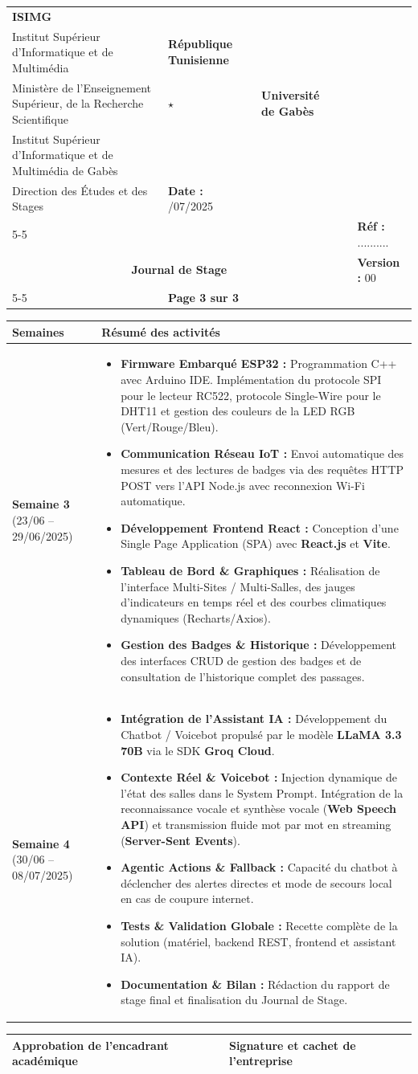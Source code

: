 \documentclass[11pt,a4paper]{article}
\newcommand{\journalheader}[1]{%
\noindent
\begin{tabular}{|p{3.2cm}|p{4.4cm}|p{0.7cm}|p{4.7cm}|p{3.2cm}|}
\hline
\centering \textbf{ISIMG}\\[2pt] {\tiny Institut Supérieur d'Informatique et de Multimédia}
& \centering \scriptsize \textbf{République Tunisienne}\\[2pt] \scriptsize Ministère de l'Enseignement Supérieur, de la Recherche Scientifique
& \centering \Large $\star$
& \centering \scriptsize \textbf{Université de Gabès}\\[2pt] \scriptsize Institut Supérieur d'Informatique et de Multimédia de Gabès\\[2pt] \scriptsize Direction des Études et des Stages
& \textbf{Date :} \newline 06/07/2025 \\ \cline{5-5}
& & & & \textbf{Réf :} .......... \\ \hline
\multicolumn{4}{|c|}{\textbf{\Large Journal de Stage}} & \textbf{Version :} 00 \\ \cline{5-5}
\multicolumn{4}{|c|}{} & \textbf{Page #1 sur 3} \\ \hline
\end{tabular}%
\par\vspace{0.8cm}
}
\begin{document}
\newpage
\journalheader{3}

\noindent
\begin{tabular}{|p{4.2cm}|p{12.8cm}|}
\hline
\centering \textbf{\Large Semaines} & \centering \textbf{\Large Résumé des activités} \tabularnewline
\hline
\textbf{\large Semaine 3} \newline \newline \small (23/06 -- 29/06/2025)
& 
\begin{itemize}[leftmargin=*]
    \item \textbf{Firmware Embarqué ESP32 :} Programmation C++ avec Arduino IDE. Implémentation du protocole SPI pour le lecteur RC522, protocole Single-Wire pour le DHT11 et gestion des couleurs de la LED RGB (Vert/Rouge/Bleu).
    \item \textbf{Communication Réseau IoT :} Envoi automatique des mesures et des lectures de badges via des requêtes HTTP POST vers l'API Node.js avec reconnexion Wi-Fi automatique.
    \item \textbf{Développement Frontend React :} Conception d'une Single Page Application (SPA) avec \textbf{React.js} et \textbf{Vite}.
    \item \textbf{Tableau de Bord \& Graphiques :} Réalisation de l'interface Multi-Sites / Multi-Salles, des jauges d'indicateurs en temps réel et des courbes climatiques dynamiques (Recharts/Axios).
    \item \textbf{Gestion des Badges \& Historique :} Développement des interfaces CRUD de gestion des badges et de consultation de l'historique complet des passages.
\end{itemize}
\tabularnewline
\hline
\textbf{\large Semaine 4} \newline \newline \small (30/06 -- 08/07/2025)
& 
\begin{itemize}[leftmargin=*]
    \item \textbf{Intégration de l'Assistant IA :} Développement du Chatbot / Voicebot propulsé par le modèle \textbf{LLaMA 3.3 70B} via le SDK \textbf{Groq Cloud}.
    \item \textbf{Contexte Réel \& Voicebot :} Injection dynamique de l'état des salles dans le System Prompt. Intégration de la reconnaissance vocale et synthèse vocale (\textbf{Web Speech API}) et transmission fluide mot par mot en streaming (\textbf{Server-Sent Events}).
    \item \textbf{Agentic Actions \& Fallback :} Capacité du chatbot à déclencher des alertes directes et mode de secours local en cas de coupure internet.
    \item \textbf{Tests \& Validation Globale :} Recette complète de la solution (matériel, backend REST, frontend et assistant IA).
    \item \textbf{Documentation \& Bilan :} Rédaction du rapport de stage final et finalisation du Journal de Stage.
\end{itemize}
\tabularnewline
\hline
\end{tabular}

\vspace{1cm}

\noindent
\begin{tabular}{|p{8.2cm}|p{8.8cm}|}
\hline
\rule{0pt}{0.6cm} \centering \textbf{\large Approbation de l'encadrant académique} & \centering \textbf{\large Signature et cachet de l'entreprise} \\[2.8cm]
\hline
\end{tabular}
\end{document}
